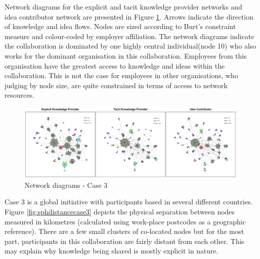 Network diagrams for the explicit and tacit knowledge provider networks and idea contributor network are presented in Figure \ref{fig:thesisnetworkscase3}. Arrows indicate the direction of knowledge and idea flows. Nodes are sized according to Burt's constraint measure and colour-coded by employer affiliation. The network diagrams indicate the collaboration is dominated by one highly central individual(node 10) who also works for the dominant organisation in this collaboration. Employees from this organisation have the greatest access to knowledge and ideas within the collaboration. This is not the case for employees in other organisations, who judging by node size, are quite constrained in terms of access to network resources.\medskip

\begin{landscape}
\begin{figure}
	\centering
	\includegraphics[width=1.0\linewidth]{Images/thesis_networks_case3}
	\caption{Network diagrams - Case 3}
	\label{fig:thesisnetworkscase3}
\end{figure}
\end{landscape}

Case 3 is a global initiative with participants based in several different countries. Figure \ref{fig:sphdistancecase3} depicts the physical separation between nodes measured in kilometres (calculated using work-place postcodes as a geographic reference). There are a few small clusters of co-located nodes but for the most part, participants in this collaboration are fairly distant from each other. This may explain why knowledge being shared is mostly explicit in nature.  \medskip  

